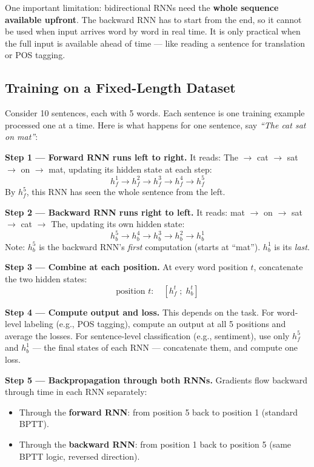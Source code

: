 One important limitation: bidirectional RNNs need the \textbf{whole sequence available upfront}. The backward RNN has to start from the end, so it cannot be used when input arrives word by word in real time. It is only practical when the full input is available ahead of time --- like reading a sentence for translation or POS tagging.


\subsection{Training on a Fixed-Length Dataset}

Consider 10 sentences, each with 5 words. Each sentence is one training example processed one at a time. Here is what happens for one sentence, say \textit{``The cat sat on mat''}:

\textbf{Step 1 --- Forward RNN runs left to right.}
It reads: The $\rightarrow$ cat $\rightarrow$ sat $\rightarrow$ on $\rightarrow$ mat, updating its hidden state at each step:
\[
h_f^1 \rightarrow h_f^2 \rightarrow h_f^3 \rightarrow h_f^4 \rightarrow h_f^5
\]
By $h_f^5$, this RNN has seen the whole sentence from the left.

\textbf{Step 2 --- Backward RNN runs right to left.}
It reads: mat $\rightarrow$ on $\rightarrow$ sat $\rightarrow$ cat $\rightarrow$ The, updating its own hidden state:
\[
h_b^5 \rightarrow h_b^4 \rightarrow h_b^3 \rightarrow h_b^2 \rightarrow h_b^1
\]
Note: $h_b^5$ is the backward RNN's \textit{first} computation (starts at ``mat''). $h_b^1$ is its \textit{last}.

\textbf{Step 3 --- Combine at each position.}
At every word position $t$, concatenate the two hidden states:
\[
\text{position } t: \quad [h_f^t \; ; \; h_b^t]
\]

\textbf{Step 4 --- Compute output and loss.}
This depends on the task. For word-level labeling (e.g., POS tagging), compute an output at all 5 positions and average the losses. For sentence-level classification (e.g., sentiment), use only $h_f^5$ and $h_b^1$ --- the final states of each RNN --- concatenate them, and compute one loss.

\textbf{Step 5 --- Backpropagation through both RNNs.}
Gradients flow backward through time in each RNN separately:
\begin{itemize}
    \item Through the \textbf{forward RNN}: from position 5 back to position 1 (standard BPTT).
    \item Through the \textbf{backward RNN}: from position 1 back to position 5 (same BPTT logic, reversed direction).
\end{itemize}


